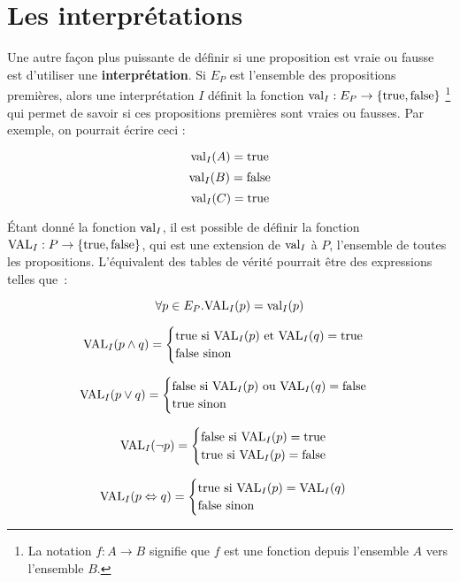 \section{Les interprétations}

Une autre façon plus puissante de définir si une proposition est vraie ou fausse est d’utiliser
une \textbf{interprétation}. Si $E_P$ est l’ensemble des propositions premières,
alors une interprétation $I$ définit la fonction $\mathrm{val}_I : E_P \rightarrow
\{\mathrm{true}, \mathrm{false}\}$ \footnote{La notation $f : A \rightarrow B$ signifie que $f$
  est une fonction depuis l’ensemble $A$ vers l’ensemble $B$.  } qui permet de
savoir si ces propositions premières sont vraies ou fausses. Par exemple, on
pourrait écrire ceci :

\[\mathrm{val}_I(A) = \mathrm{true}\]
\[\mathrm{val}_I(B) = \mathrm{false}\]
\[\mathrm{val}_I(C) = \mathrm{true}\]

Étant donné la fonction $\mathrm{val}_I$, il est possible de définir la fonction
$\mathrm{VAL}_I : P \rightarrow \{\mathrm{true}, \mathrm{false}\}$, qui est une extension de
$\mathrm{val}_I$ à $P$, l’ensemble de toutes les propositions. L’équivalent des
tables de vérité pourrait être des expressions telles que~:

\[\forall p \in E_P. \mathrm{VAL}_I(p) = \mathrm{val}_I(p)\]

\[\mathrm{VAL}_I(p \land q) = \begin{cases}
  \mathrm{true} \mbox{ si } \mathrm{VAL}_I(p) \mbox{ et } \mathrm{VAL}_I(q) = \mathrm{true} \\
  \mathrm{false}\mbox{ sinon}
\end{cases}\]

\[\mathrm{VAL}_I(p \lor q) = \begin{cases}
  \mathrm{false} \mbox{ si } \mathrm{VAL}_I(p) \mbox{ ou } \mathrm{VAL}_I(q) = \mathrm{false} \\
  \mathrm{true}\mbox{ sinon}
\end{cases}\]

\[\mathrm{VAL}_I(\lnot p) = \begin{cases}
  \mathrm{false}\mbox{ si }\mathrm{VAL}_I(p) = \mathrm{true} \\
  \mathrm{true}\mbox{ si }\mathrm{VAL}_I(p) = \mathrm{false}
\end{cases}\]

\[\mathrm{VAL}_I(p \Leftrightarrow q) = \begin{cases}
  \mathrm{true}\mbox{ si }\mathrm{VAL}_I(p) = \mathrm{VAL}_I(q) \\
  \mathrm{false}\mbox{ sinon}
\end{cases}\]

